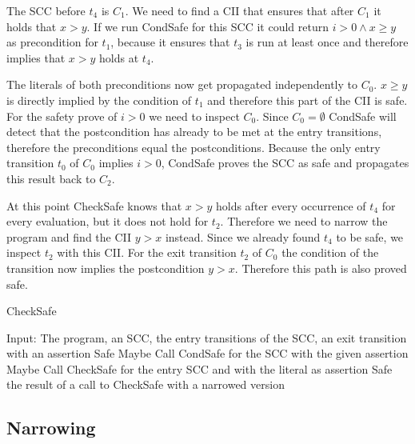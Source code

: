 The SCC before $t_4$ is $C_1$.
We need to find a CII that ensures that after $C_1$ it holds that $x > y$.
If we run CondSafe for this SCC it could return $i > 0 \wedge x \geq y$ as precondition for $t_1$, because it ensures that $t_3$ is run at least once and therefore implies that $x > y$ holds at $t_4$.

The literals of both preconditions now get propagated independently to $C_0$.
$x \geq y$ is directly implied by the condition of $t_1$ and therefore this part of the CII is safe.
For the safety prove of $i > 0$ we need to inspect $C_0$.
Since $C_0 = \emptyset$ CondSafe will detect that the postcondition has already to be met at the entry transitions, therefore the preconditions equal the postconditions.
Because the only entry transition $t_0$ of $C_0$ implies $i > 0$, CondSafe proves the SCC as safe and propagates this result back to $C_2$.

At this point CheckSafe knows that $x > y$ holds after every occurrence of $t_4$ for every evaluation, but it does not hold for $t_2$.
Therefore we need to narrow the program and find the CII $y > x$ instead.
Since we already found $t_4$ to be safe, we inspect $t_2$ with this CII.
For the exit transition $t_2$ of $C_0$ the condition of the transition now implies the postcondition $y > x$.
Therefore this path is also proved safe.

\begin{algorithm}
\caption{CheckSafe}\label{checksafe}
\begin{algorithmic}[1]
  \State Input: The program, an SCC, the entry transitions of the SCC, an exit transition with an assertion
    \Return Safe
    \Return Maybe
  \EndIf
  \State Call CondSafe for the SCC with the given assertion
    \Return Maybe
  \EndIf
      \State Call CheckSafe for the entry SCC and with the literal as assertion
    \EndFor
  \EndFor
    \Return Safe
  \EndIf
  \Return the result of a call to CheckSafe with a narrowed version
\end{algorithmic}
\end{algorithm}


\subsection{Narrowing}

